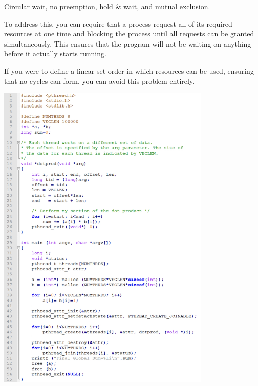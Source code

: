 \documentclass[11pt,largemargins]{homework}
\begin{document}
\clearpage
{}
\begin{alphaparts}

    Circular wait, no preemption, hold \& wait, and mutual exclusion.


    To address this, you can require that a process request all of its required
    resources at one time and blocking the process until all requests can be
    granted simultaneously. This ensures that the program will not be waiting
    on anything before it actually starts running.


    If you were to define a linear set order in which resources can be used,
    ensuring
    that no cycles can form, you can avoid this problem entirely.
\end{alphaparts}

\clearpage
{}

    \begin{center}
        \includegraphics[width=4in]{q3code.jpg}
    \end{center}
    
\end{document}
